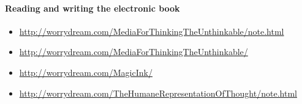 \documentclass{article}
\begin{document}
\paragraph{Reading and writing the electronic book~\cite{marshall2009reading}}

\begin{itemize}
\item \url{http://worrydream.com/MediaForThinkingTheUnthinkable/note.html}
\item \url{http://worrydream.com/MediaForThinkingTheUnthinkable/}
\item \url{http://worrydream.com/MagicInk/}
\item \url{http://worrydream.com/TheHumaneRepresentationOfThought/note.html}
\end{itemize}


\end{document}
